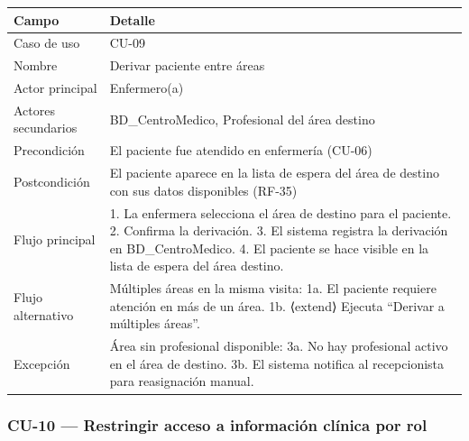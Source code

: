 \documentclass[11pt,a4paper]{article}
\begin{document}
	\begin{longtable}{p{} p{} }
		
		
		\toprule
		\textbf{Campo} &
		\textbf{Detalle}  \\
		\midrule
		\endhead
		
		Caso de uso & CU-09 \\
		Nombre & Derivar paciente entre áreas \\
		Actor principal & Enfermero(a) \\
		Actores secundarios & BD\_CentroMedico, Profesional del área destino \\
		Precondición & El paciente fue atendido en enfermería (CU-06) \\
		Postcondición & El paciente aparece en la lista de espera del área de destino con sus datos disponibles (RF-35) \\
		Flujo principal & 1. La enfermera selecciona el área de destino para el paciente. 2. Confirma la derivación. 3. El sistema registra la derivación en BD\_CentroMedico. 4. El paciente se hace visible en la lista de espera del área destino. \\
		Flujo alternativo & Múltiples áreas en la misma visita: 1a. El paciente requiere atención en más de un área. 1b. ⟨extend⟩ Ejecuta ``Derivar a múltiples áreas''. \\
		Excepción & Área sin profesional disponible: 3a. No hay profesional activo en el área de destino. 3b. El sistema notifica al recepcionista para reasignación manual. \\
		\bottomrule
	\end{longtable}
	
	\subsubsection{CU-10 --- Restringir acceso a información clínica por rol}
	
\end{document}
